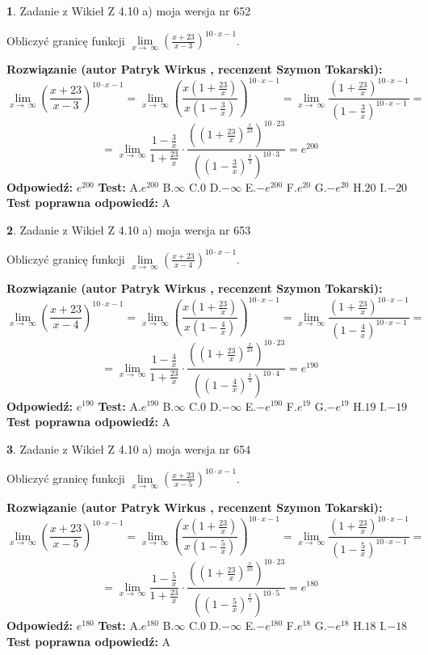 \documentclass[12pt, a4paper]{article}
\theoremstyle{definition} %
\newtheorem{zad}{}
\newcommand{\zadStart}[1]{\begin{zad}#1\newline}
\newcommand{\zadStop}{\end{zad}}
\newcommand{\rozwStart}[2]{\noindent \textbf{Rozwiązanie (autor #1 , recenzent #2): }\newline}
\newcommand{\rozwStop}{\newline}
\newcommand{\odpStart}{\noindent \textbf{Odpowiedź:}\newline}
\newcommand{\odpStop}{\newline}
\newcommand{\testStart}{\noindent \textbf{Test:}\newline}
\newcommand{\testStop}{\newline}
\newcommand{\kluczStart}{\noindent \textbf{Test poprawna odpowiedź:}\newline}
\newcommand{\kluczStop}{\newline}
\begin{document}
\zadStart{Zadanie z Wikieł Z 4.10 a) moja wersja nr 652}

Obliczyć granicę funkcji  $\lim\limits_{x\to\ \infty}(\frac{x+23}{x-3})^{10\cdot x-1}$.
\zadStop
\rozwStart{Patryk Wirkus}{Szymon Tokarski}
$$\lim\limits_{x\to\ \infty}(\frac{x+23}{x-3})^{10\cdot x-1} = \lim\limits_{x\to\ \infty}(\frac{x(1+\frac{23}{x})}{x(1-\frac{3}{x})})^{10\cdot x-1}=\lim\limits_{x\to\ \infty}\frac{(1+\frac{23}{x})^{10\cdot x-1}}{(1-\frac{3}{x})^{10\cdot x-1}}=$$
$$=\lim\limits_{x\to\ \infty}\frac{1-\frac{3}{x}}{1+\frac{23}{x}}\cdot\frac{((1+\frac{23}{x})^{\frac{x}{23}})^{10\cdot23}}{((1-\frac{3}{x})^{\frac{x}{3}})^{10\cdot3}}=e^{200}$$
\rozwStop
\odpStart
$e^{200}$
\odpStop
\testStart
A.$e^{200}$ B.$\infty$ C.$0$ D.$-\infty$ E.$-e^{200}$
F.$e^{20}$ G.$-e^{20}$
H.$20$
I.$-20$
\testStop
\kluczStart
A
\kluczStop



\zadStart{Zadanie z Wikieł Z 4.10 a) moja wersja nr 653}

Obliczyć granicę funkcji  $\lim\limits_{x\to\ \infty}(\frac{x+23}{x-4})^{10\cdot x-1}$.
\zadStop
\rozwStart{Patryk Wirkus}{Szymon Tokarski}
$$\lim\limits_{x\to\ \infty}(\frac{x+23}{x-4})^{10\cdot x-1} = \lim\limits_{x\to\ \infty}(\frac{x(1+\frac{23}{x})}{x(1-\frac{4}{x})})^{10\cdot x-1}=\lim\limits_{x\to\ \infty}\frac{(1+\frac{23}{x})^{10\cdot x-1}}{(1-\frac{4}{x})^{10\cdot x-1}}=$$
$$=\lim\limits_{x\to\ \infty}\frac{1-\frac{4}{x}}{1+\frac{23}{x}}\cdot\frac{((1+\frac{23}{x})^{\frac{x}{23}})^{10\cdot23}}{((1-\frac{4}{x})^{\frac{x}{4}})^{10\cdot4}}=e^{190}$$
\rozwStop
\odpStart
$e^{190}$
\odpStop
\testStart
A.$e^{190}$ B.$\infty$ C.$0$ D.$-\infty$ E.$-e^{190}$
F.$e^{19}$ G.$-e^{19}$
H.$19$
I.$-19$
\testStop
\kluczStart
A
\kluczStop



\zadStart{Zadanie z Wikieł Z 4.10 a) moja wersja nr 654}

Obliczyć granicę funkcji  $\lim\limits_{x\to\ \infty}(\frac{x+23}{x-5})^{10\cdot x-1}$.
\zadStop
\rozwStart{Patryk Wirkus}{Szymon Tokarski}
$$\lim\limits_{x\to\ \infty}(\frac{x+23}{x-5})^{10\cdot x-1} = \lim\limits_{x\to\ \infty}(\frac{x(1+\frac{23}{x})}{x(1-\frac{5}{x})})^{10\cdot x-1}=\lim\limits_{x\to\ \infty}\frac{(1+\frac{23}{x})^{10\cdot x-1}}{(1-\frac{5}{x})^{10\cdot x-1}}=$$
$$=\lim\limits_{x\to\ \infty}\frac{1-\frac{5}{x}}{1+\frac{23}{x}}\cdot\frac{((1+\frac{23}{x})^{\frac{x}{23}})^{10\cdot23}}{((1-\frac{5}{x})^{\frac{x}{5}})^{10\cdot5}}=e^{180}$$
\rozwStop
\odpStart
$e^{180}$
\odpStop
\testStart
A.$e^{180}$ B.$\infty$ C.$0$ D.$-\infty$ E.$-e^{180}$
F.$e^{18}$ G.$-e^{18}$
H.$18$
I.$-18$
\testStop
\kluczStart
A
\kluczStop
\end{document}
